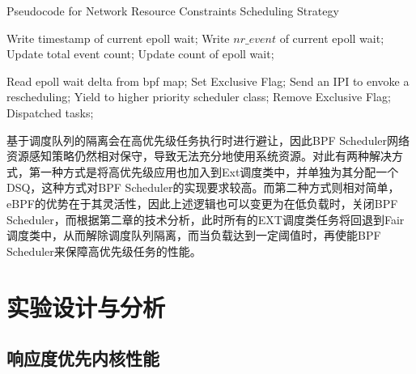 \begin{algorithm}[H]
    \caption{Pseudocode for Network Resource Constraints Scheduling Strategy}
    \label{alg:network_aware_sched}
    \begin{algorithmic}[1]

        \State Write timestamp of current epoll wait;
        \State Write $nr\_event$ of current epoll wait;
        \State Update total event count;
        \State Update count of epoll wait;
    \EndFunction

            \State Read epoll wait delta from bpf map;
                \State Set Exclusive Flag;
                    \State Send an IPI to envoke a rescheduling;
                \EndFor
                \State Yield to higher priority scheduler class;
            \EndIf
            \State Remove Exclusive Flag;
            \State Dispatched tasks;
        \EndWhile
    \EndFunction
    \end{algorithmic}
\end{algorithm}

基于调度队列的隔离会在高优先级任务执行时进行避让，因此BPF Scheduler网络资源感知策略仍然相对保守，导致无法充分地使用系统资源。对此有两种解决方式，第一种方式是将高优先级应用也加入到Ext调度类中，并单独为其分配一个DSQ，这种方式对BPF Scheduler的实现要求较高。而第二种方式则相对简单，eBPF的优势在于其灵活性，因此上述逻辑也可以变更为在低负载时，关闭BPF Scheduler，而根据第二章的技术分析，此时所有的EXT调度类任务将回退到Fair调度类中，从而解除调度队列隔离，而当负载达到一定阈值时，再使能BPF Scheduler来保障高优先级任务的性能。


\section{实验设计与分析}

\subsection{响应度优先内核性能}


